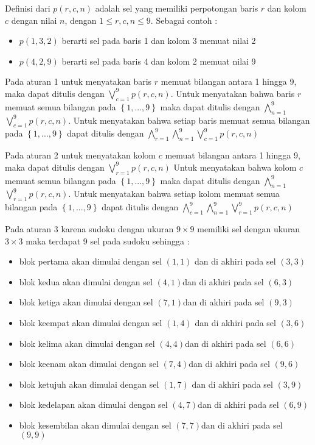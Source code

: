 Definisi dari $p\left(r,c,n\right)$ adalah sel yang memiliki perpotongan baris $r$ dan kolom $c$ dengan nilai $n$, dengan $1 \leq r,c,n \leq 9$. Sebagai contoh :

\begin{itemize}
	\item $p\left(1,3,2\right)$ berarti sel pada baris 1 dan kolom 3 memuat nilai 2
	\item $p\left(4,2,9\right)$ berarti sel pada baris 4 dan kolom 2 memuat nilai 9
\end{itemize}

Pada aturan 1 untuk menyatakan baris $r$ memuat bilangan antara 1 hingga 9, maka dapat ditulis dengan  $\bigvee_{c=1}^{9}$$p\left(r,c,n\right)$. Untuk menyatakan bahwa baris $r$ memuat semua bilangan pada $\left\{1,...,9\right\}$ maka dapat ditulis dengan $\bigwedge_{n=1}^{9}$$\bigvee_{c=1}^{9}$$p\left(r,c,n\right)$. Untuk menyatakan bahwa setiap baris memuat semua bilangan pada $\left\{1,...,9\right\}$ dapat ditulis dengan $\bigwedge_{r=1}^{9}$$\bigwedge_{n=1}^{9}$$\bigvee_{c=1}^{9}$$p\left(r,c,n\right)$

Pada aturan 2  untuk menyatakan kolom $c$ memuat bilangan antara 1 hingga 9, maka dapat ditulis dengan  $\bigvee_{r=1}^{9}$$p\left(r,c,n\right)$
Untuk menyatakan bahwa kolom $c$ memuat semua bilangan pada $\left\{1,...,9\right\}$ maka dapat ditulis dengan $\bigwedge_{n=1}^{9}$$\bigvee_{r=1}^{9}$$p\left(r,c,n\right)$. Untuk menyatakan bahwa setiap kolom memuat semua bilangan pada $\left\{1,...,9\right\}$ dapat ditulis dengan $\bigwedge_{c=1}^{9}$$\bigwedge_{n=1}^{9}$$\bigvee_{r=1}^{9}$$p\left(r,c,n\right)$
 
Pada aturan 3 karena sudoku dengan ukuran $9\times9$ memiliki sel dengan ukuran $3\times3$ maka terdapat 9 sel pada sudoku sehingga :
\begin{itemize}
	\item blok pertama akan dimulai dengan sel $\left(1,1\right)$ dan di akhiri
	pada sel $\left(3,3\right)$
	\item blok kedua akan dimulai dengan sel $\left(4,1\right)$dan di akhiri
	pada sel $\left(6,3\right)$
	\item blok ketiga akan dimulai dengan sel $\left(7,1\right)$dan di akhiri
	pada sel $\left(9,3\right)$
	\item blok keempat akan dimulai dengan sel $\left(1,4\right)$ dan di akhiri
	pada sel $\left(3,6\right)$
	\item blok kelima akan dimulai dengan sel $\left(4,4\right)$dan di akhiri
	pada sel $\left(6,6\right)$
	\item blok keenam akan dimulai dengan sel $\left(7,4\right)$dan di akhiri
	pada sel $\left(9,6\right)$
	\item blok ketujuh akan dimulai dengan sel $\left(1,7\right)$ dan di akhiri
	pada sel $\left(3,9\right)$
	\item blok kedelapan akan dimulai dengan sel $\left(4,7\right)$dan di akhiri
	pada sel $\left(6,9\right)$
	\item blok kesembilan akan dimulai dengan sel $\left(7,7\right)$dan di akhiri
	pada sel $\left(9,9\right)$
\end{itemize}

